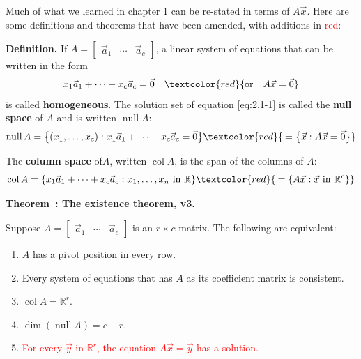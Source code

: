 \documentclass[11pt, letterpaper]{report}
\newenvironment{notes}{}{}
\let\originalleft\left
\let\originalright\right
\renewcommand{\left}{\mathopen{}\mathclose\bgroup\originalleft}
\renewcommand{\right}{\aftergroup\egroup\originalright}
\newenvironment{definition}{\begin{bbox}\par\noindent\textbf{Definition. }}
  {\end{bbox}}
\newcounter{theorem}[chapter]
\newenvironment{theorem}[1][]{\refstepcounter{theorem}\begin{bbox}\par
    \noindent\textbf{Theorem~\thetheorem: #1}}{\end{bbox}}
\newlength\oldfboxsep%
\newlength\myminiwidth%
\newenvironment{bbox}{%
  \setlength\oldfboxsep\fboxsep
  \setlength{\fboxsep}{.1in}%
  \setlength\myminiwidth\linewidth%
  \addtolength\myminiwidth{-0.2in}%
  \vspace{0.1in}%
  \begin{lrbox}{\bboxbox}\begin{minipage}{\myminiwidth}%
    }{%
    \end{minipage}\end{lrbox}%
  \noindent\fbox{\usebox{\bboxbox}}\vspace{0.1in}\setlength\fboxsep\oldfboxsep%
}
\newcommand{\R}{\mathbb{R}}
\DeclareMathOperator{\col}{col}
\DeclareMathOperator{\nul}{null}
\begin{document}
\begin{notes}
\end{notes}
Much of what we learned in chapter 1 can be re-stated in terms of $A\vec{x}$. Here are some definitions and theorems that have been amended, with additions in \textcolor{red}{red}:

\begin{definition} 
If $A =
\begin{bmatrix}
\vec{a}_1 & \cdots & \vec{a}_c
\end{bmatrix}
$, a linear system of equations that can be written in the form 
\begin{equation}\label{eq:2.1-1}
x_1 \vec{a}_1 + \cdots + x_c\vec{a}_c = \vec{0} \quad \textcolor{red}{\text{or} \quad A\vec{x}=\vec{0}} 
\end{equation}
is called \textbf{homogeneous}. 
The solution set of equation \ref{eq:2.1-1} is called the \textbf{null space} of $A$ and is written 
$\nul A$:
\[\nul A = \left\{ (x_1,\ldots,x_c) : x_1\vec{a}_1+\cdots+x_c\vec{a}_c=\vec{0} \right\} \textcolor{red}{\hspace{.5ex} = \left\{ \vec{x} : A\vec{x}=\vec{0} \right\}} \]

The \textbf{column space} of$A$, written $\col A$, is the span of the columns of $A$:
\[\col A = \left\{ x_1\vec{a}_1 + \cdots + x_c\vec{a}_c : x_1,\ldots,x_n \text { in } \R \right\}  
\textcolor{red}{\hspace{.5ex} = \left\{ A\vec{x} : \vec{x} \text{ in } \R^c \right\}}\]
\end{definition}

\begin{theorem}[The existence theorem, v3.]  
\label{theorem:1.7existence-v3}

Suppose $A =
\begin{bmatrix}
\vec{a}_1 & \cdots & \vec{a}_c
\end{bmatrix}
$ is an $r \times c$ matrix. The following are equivalent:
\begin{enumerate}[label=(\roman*)]
\item $A$ has a pivot position in every row.
\item Every system of equations that has $A$ as its coefficient matrix is consistent.
\item $\col A = \R^r$.
\item $\dim(\nul A) = c-r$.
\item \textcolor{red}{For every $\vec{y}$ in $\R^{r}$, the equation $A\vec{x}=\vec{y}$ has a solution.}
\end{enumerate}
\end{theorem}
\end{document}
